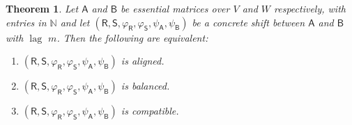 \documentclass[11pt, letterpaper,final]{amsart}
\newcommand{\bbN}{{\mathbb{N}}}
\newcommand{\lag}{\operatorname{lag}}
\newtheorem{thm}{Theorem}[section]
\theoremstyle{definition}
\begin{document}
\begin{thm}\label{thm:balanced->compatible}
Let $\mathsf{A}$ and $\mathsf{B}$ be essential matrices over $V$ and $W$ respectively, with entries in $\bbN$ and let $(\mathsf{R}, \mathsf{S}, \varphi_\mathsf{R}, \varphi_\mathsf{S}, \psi_\mathsf{A}, \psi_\mathsf{B})$ be a concrete shift between $\mathsf{A}$ and $\mathsf{B}$ with $\lag$ $m$. Then the following are equivalent:
\begin{enumerate}
\item $(\mathsf{R}, \mathsf{S}, \varphi_\mathsf{R}, \varphi_\mathsf{S}, \psi_\mathsf{A}, \psi_\mathsf{B})$ is aligned.
\item $(\mathsf{R}, \mathsf{S}, \varphi_\mathsf{R}, \varphi_\mathsf{S}, \psi_\mathsf{A}, \psi_\mathsf{B})$ is balanced.
\item $(\mathsf{R}, \mathsf{S}, \varphi_\mathsf{R}, \varphi_\mathsf{S}, \psi_\mathsf{A}, \psi_\mathsf{B})$ is compatible. 
\end{enumerate}
\end{thm}
\end{document}
